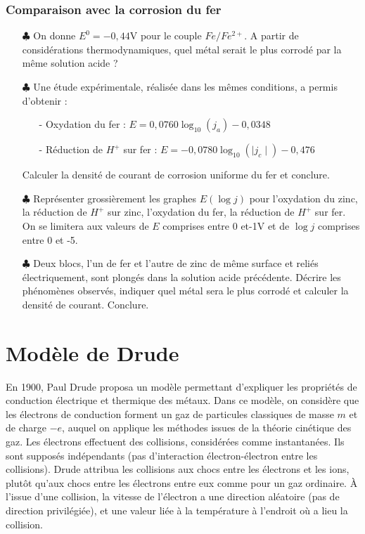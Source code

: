 \documentclass{report}
\begin{document}
\subsubsection*{Comparaison avec la corrosion du fer}

\begin{itemize}
	
		\item[$\clubsuit$] On donne $E^0=-0,44$V pour le couple $Fe/Fe^{2+}$. A partir de considérations thermodynamiques, quel métal serait le plus corrodé par la même solution acide ?
		
	\item[$\clubsuit$] Une étude expérimentale, réalisée dans les mêmes conditions, a permis d'obtenir :
	\begin{itemize}
		\item[-] Oxydation du fer : $E=0,0760\log_{10}(j_a)-0,0348$
		\item[-] Réduction de $H^+$ sur fer : $E=-0,0780\log_{10}(\mid j_c\mid)-0,476$
	\end{itemize}
	Calculer la densité de courant de corrosion uniforme du fer et conclure.
		
	\item[$\clubsuit$] Représenter grossièrement les graphes $E(\log j)$ pour l'oxydation du zinc, la réduction de $H^+$ sur zinc, l'oxydation du fer, la réduction de $H^+$ sur fer. On se limitera aux valeurs de $E$ comprises entre 0 et-1V et de $\log j$ comprises entre 0 et -5.
	
	\item[$\clubsuit$] Deux blocs, l'un de fer et l'autre de zinc de même surface et reliés électriquement, sont plongés dans la solution acide précédente. Décrire les phénomènes observés, indiquer quel métal sera le plus corrodé et calculer la densité de courant. Conclure. 
	
\end{itemize}

\newpage

\section*{Modèle de Drude}

En 1900, Paul Drude proposa un modèle permettant d'expliquer les propriétés de conduction électrique et thermique des métaux. Dans ce modèle, on considère que les électrons de conduction forment un gaz de particules classiques de masse $m$ et de charge $-e$, auquel on applique les méthodes issues de la théorie cinétique des gaz. Les électrons effectuent des collisions, considérées comme instantanées. Ils sont supposés indépendants (pas d'interaction électron-électron entre les collisions). Drude attribua les collisions aux chocs entre les électrons et les ions, plutôt qu'aux chocs entre les électrons entre eux comme pour un gaz ordinaire. À l'issue d'une collision, la vitesse de l'électron a une direction aléatoire (pas de direction privilégiée), et une valeur liée à la température à l'endroit où a lieu la collision.
\end{document}
